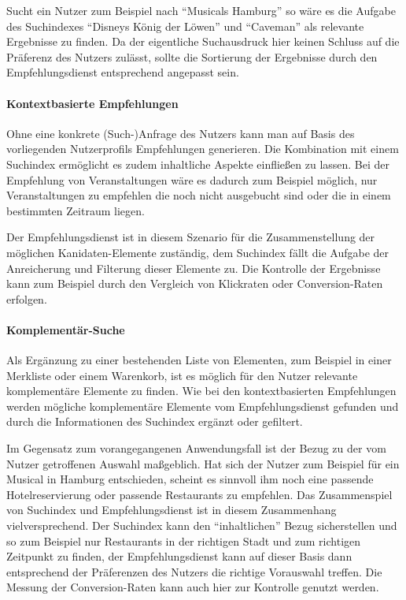 Sucht ein Nutzer zum Beispiel nach ``Musicals Hamburg'' so wäre es die Aufgabe des Suchindexes ``Disneys König der Löwen'' und ``Caveman'' als relevante Ergebnisse zu finden. Da der eigentliche Suchausdruck hier keinen Schluss auf die Präferenz des Nutzers zulässt, sollte die Sortierung der Ergebnisse durch den Empfehlungsdienst entsprechend angepasst sein.


\paragraph{Kontextbasierte Empfehlungen} Ohne eine konkrete (Such-)Anfrage des Nutzers kann man auf Basis des vorliegenden Nutzerprofils Empfehlungen generieren.  Die Kombination mit einem Suchindex ermöglicht es zudem inhaltliche Aspekte einfließen zu lassen. Bei der Empfehlung von Veranstaltungen wäre es dadurch zum Beispiel möglich, nur Veranstaltungen zu empfehlen die noch nicht ausgebucht sind oder die in einem bestimmten Zeitraum liegen.

Der Empfehlungsdienst ist in diesem Szenario für die Zusammenstellung der möglichen Kanidaten-Elemente zuständig, dem Suchindex fällt die Aufgabe der Anreicherung und Filterung dieser Elemente zu. Die Kontrolle der Ergebnisse kann zum Beispiel durch den Vergleich von Klickraten oder Conversion-Raten erfolgen.

\paragraph{Komplementär-Suche} Als Ergänzung zu einer bestehenden Liste von Elementen, zum Beispiel in einer Merkliste oder einem Warenkorb, ist es möglich für den Nutzer relevante komplementäre Elemente zu finden. Wie bei den kontextbasierten Empfehlungen werden mögliche komplementäre Elemente vom Empfehlungsdienst gefunden und durch die Informationen des Suchindex ergänzt oder gefiltert.

Im Gegensatz zum vorangegangenen Anwendungsfall ist der Bezug zu der vom Nutzer getroffenen Auswahl maßgeblich. Hat sich der Nutzer zum Beispiel für ein Musical in Hamburg entschieden, scheint es sinnvoll ihm noch eine passende Hotelreservierung oder passende Restaurants zu empfehlen. Das Zusammenspiel von Suchindex und Empfehlungsdienst ist in diesem Zusammenhang vielversprechend. Der Suchindex kann den ``inhaltlichen'' Bezug sicherstellen und so zum Beispiel nur Restaurants in der richtigen Stadt und zum richtigen Zeitpunkt zu finden, der Empfehlungsdienst kann auf dieser Basis dann entsprechend der Präferenzen des Nutzers die richtige Vorauswahl treffen. Die Messung der Conversion-Raten kann auch hier zur Kontrolle genutzt werden.

